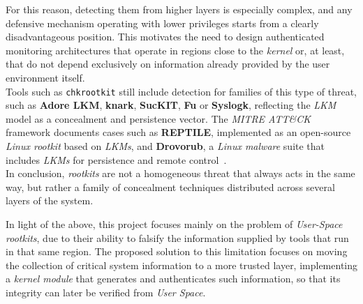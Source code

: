 For this reason, detecting them from higher layers is especially complex, and any defensive mechanism operating with lower privileges starts from a clearly disadvantageous position.
This motivates the need to design authenticated monitoring architectures that operate in regions close to the \textit{kernel} or, at least, that do not depend exclusively on information already provided by the user environment itself.\\

Tools such as \texttt{chkrootkit} still include detection for families of this type of threat, such as \textbf{Adore LKM}, \textbf{knark}, \textbf{SucKIT}, \textbf{Fu} or \textbf{Syslogk}, reflecting the \textit{LKM} model as a concealment and persistence vector.
The \textit{MITRE ATT\&CK} framework documents cases such as \textbf{REPTILE}, implemented as an open-source \textit{Linux rootkit} based on \textit{LKMs}, and \textbf{Drovorub}, a \textit{Linux malware} suite that includes \textit{LKMs} for persistence and remote control~\cite{chkrootkit_man}.\\


In conclusion, \textit{rootkits} are not a homogeneous threat that always acts in the same way, but rather a family of concealment techniques distributed across several layers of the system.\\

\newpage

In light of the above, this project focuses mainly on the problem of \textit{User-Space rootkits}, due to their ability to falsify the information supplied by tools that run in that same region.
The proposed solution to this limitation focuses on moving the collection of critical system information to a more trusted layer, implementing a \textit{kernel module} that generates and authenticates such information, so that its integrity can later be verified from \textit{User Space}.
